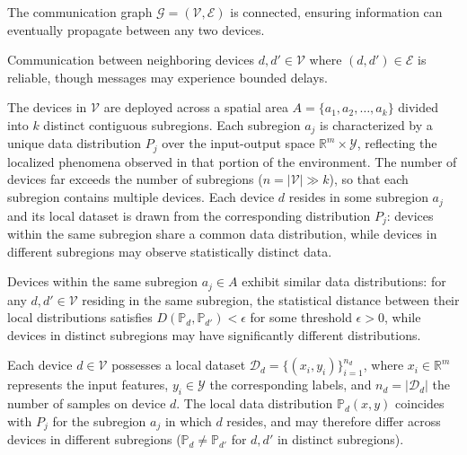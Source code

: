 \begin{assumption}\label{assumption:network-connectivity}
The communication graph $\mathcal{G} = (\mathcal{V}, \mathcal{E})$ is connected, 
 ensuring information can eventually propagate between any two devices.
\end{assumption}
%
\begin{assumption}\label{assumption:reliable-message-delivery}
Communication between neighboring devices $d, d' \in \mathcal{V}$ where $(d, d') \in \mathcal{E}$ is reliable, 
 though messages may experience bounded delays.
\end{assumption}

The devices in $\mathcal{V}$ are deployed across a spatial area
 $A = \{a_1, a_2, \ldots, a_k\}$ divided into $k$ distinct contiguous subregions.
%
Each subregion $a_j$ is characterized by a unique data distribution $P_j$
 over the input-output space $\mathbb{R}^m \times \mathcal{Y}$,
 reflecting the localized phenomena observed in that portion of the environment.
%
The number of devices far exceeds the number of subregions ($n = |\mathcal{V}| \gg k$),
 so that each subregion contains multiple devices.
%
Each device $d$ resides in some subregion $a_j$
 and its local dataset is drawn from the corresponding distribution $P_j$:
 devices within the same subregion share a common data distribution,
 while devices in different subregions may observe statistically distinct data.
%
\begin{assumption}\label{assumption:spatial-data-correlation}
Devices within the same subregion $a_j \in A$ exhibit similar data distributions:
 for any $d, d' \in \mathcal{V}$ residing in the same subregion,
 the statistical distance between their local distributions satisfies
 $D(\mathbb{P}_d, \mathbb{P}_{d'}) < \epsilon$ for some threshold $\epsilon > 0$,
 while devices in distinct subregions may have significantly different distributions.
\end{assumption}

Each device $d \in \mathcal{V}$ possesses a local dataset $\mathcal{D}_d = \{(x_i, y_i)\}_{i=1}^{n_d}$,
 where $x_i \in \mathbb{R}^m$ represents the input features, $y_i \in \mathcal{Y}$ the corresponding labels,
 and $n_d = |\mathcal{D}_d|$ the number of samples on device $d$.
%
The local data distribution $\mathbb{P}_d(x,y)$ coincides with $P_j$ for the subregion $a_j$
 in which $d$ resides,
 and may therefore differ across devices in different subregions
 ($\mathbb{P}_d \neq \mathbb{P}_{d'}$ for $d, d'$ in distinct subregions). 

